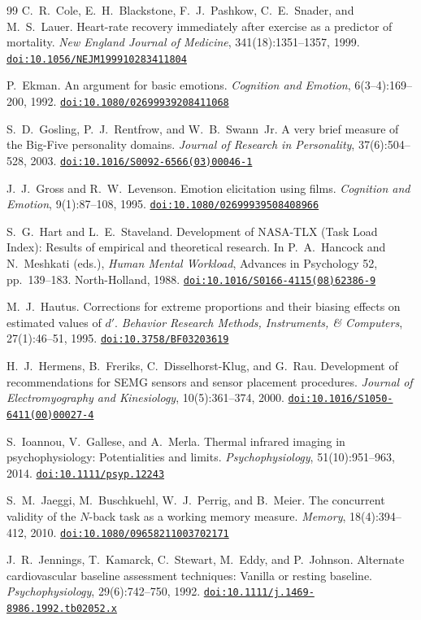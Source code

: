\documentclass[11pt,a4paper]{article}
\newcommand{\doi}[1]{\href{https://doi.org/#1}{\nolinkurl{doi:#1}}}
\begin{document}
\begin{thebibliography}{99}
 C.~R.~Cole, E.~H.~Blackstone, F.~J.~Pashkow, C.~E.~Snader, and M.~S.~Lauer. Heart-rate recovery
immediately after exercise as a predictor of mortality. \emph{New England Journal of Medicine}, 341(18):1351--1357,
1999. \doi{10.1056/NEJM199910283411804}

 P.~Ekman. An argument for basic emotions. \emph{Cognition and Emotion}, 6(3--4):169--200, 1992.
\doi{10.1080/02699939208411068}

 S.~D.~Gosling, P.~J.~Rentfrow, and W.~B.~Swann~Jr. A very brief measure of the Big-Five
personality domains. \emph{Journal of Research in Personality}, 37(6):504--528, 2003.
\doi{10.1016/S0092-6566(03)00046-1}

 J.~J.~Gross and R.~W.~Levenson. Emotion elicitation using films. \emph{Cognition and Emotion},
9(1):87--108, 1995. \doi{10.1080/02699939508408966}

 S.~G.~Hart and L.~E.~Staveland. Development of NASA-TLX (Task Load Index): Results of empirical and
theoretical research. In P.~A.~Hancock and N.~Meshkati (eds.), \emph{Human Mental Workload}, Advances in Psychology
52, pp.~139--183. North-Holland, 1988. \doi{10.1016/S0166-4115(08)62386-9}

 M.~J.~Hautus. Corrections for extreme proportions and their biasing effects on estimated values
of $d'$. \emph{Behavior Research Methods, Instruments, \& Computers}, 27(1):46--51, 1995. \doi{10.3758/BF03203619}

 H.~J.~Hermens, B.~Freriks, C.~Disselhorst-Klug, and G.~Rau. Development of recommendations
for SEMG sensors and sensor placement procedures. \emph{Journal of Electromyography and Kinesiology},
10(5):361--374, 2000. \doi{10.1016/S1050-6411(00)00027-4}

 S.~Ioannou, V.~Gallese, and A.~Merla. Thermal infrared imaging in psychophysiology:
Potentialities and limits. \emph{Psychophysiology}, 51(10):951--963, 2014. \doi{10.1111/psyp.12243}

 S.~M.~Jaeggi, M.~Buschkuehl, W.~J.~Perrig, and B.~Meier. The concurrent validity of the $N$-back
task as a working memory measure. \emph{Memory}, 18(4):394--412, 2010. \doi{10.1080/09658211003702171}

 J.~R.~Jennings, T.~Kamarck, C.~Stewart, M.~Eddy, and P.~Johnson. Alternate cardiovascular
baseline assessment techniques: Vanilla or resting baseline. \emph{Psychophysiology}, 29(6):742--750, 1992.
\doi{10.1111/j.1469-8986.1992.tb02052.x}


\end{thebibliography}
\end{document}
